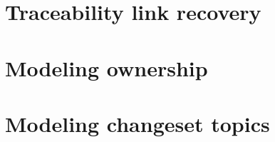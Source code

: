 
\section{Traceability link recovery}
\section{Modeling ownership}
\section{Modeling changeset topics}
